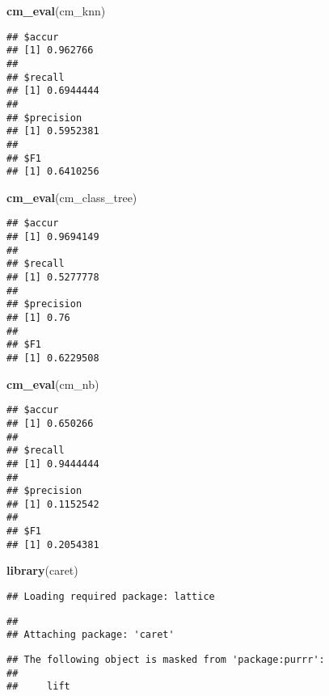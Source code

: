 \documentclass[
]{article}
\newenvironment{Shaded}{\begin{snugshade}}{\end{snugshade}}
\newcommand{\KeywordTok}[1]{\textcolor[rgb]{0.13,0.29,0.53}{\textbf{#1}}}
\newcommand{\NormalTok}[1]{#1}
\begin{document}
\begin{Shaded}
\begin{Highlighting}[]
\KeywordTok{cm_eval}\NormalTok{(cm_knn)}
\end{Highlighting}
\end{Shaded}

\begin{verbatim}
## $accur
## [1] 0.962766
## 
## $recall
## [1] 0.6944444
## 
## $precision
## [1] 0.5952381
## 
## $F1
## [1] 0.6410256
\end{verbatim}

\begin{Shaded}
\begin{Highlighting}[]
\KeywordTok{cm_eval}\NormalTok{(cm_class_tree)}
\end{Highlighting}
\end{Shaded}

\begin{verbatim}
## $accur
## [1] 0.9694149
## 
## $recall
## [1] 0.5277778
## 
## $precision
## [1] 0.76
## 
## $F1
## [1] 0.6229508
\end{verbatim}

\begin{Shaded}
\begin{Highlighting}[]
\KeywordTok{cm_eval}\NormalTok{(cm_nb)}
\end{Highlighting}
\end{Shaded}

\begin{verbatim}
## $accur
## [1] 0.650266
## 
## $recall
## [1] 0.9444444
## 
## $precision
## [1] 0.1152542
## 
## $F1
## [1] 0.2054381
\end{verbatim}

\begin{Shaded}
\begin{Highlighting}[]
\KeywordTok{library}\NormalTok{(caret)}
\end{Highlighting}
\end{Shaded}

\begin{verbatim}
## Loading required package: lattice
\end{verbatim}

\begin{verbatim}
## 
## Attaching package: 'caret'
\end{verbatim}

\begin{verbatim}
## The following object is masked from 'package:purrr':
## 
##     lift
\end{verbatim}
\end{document}
